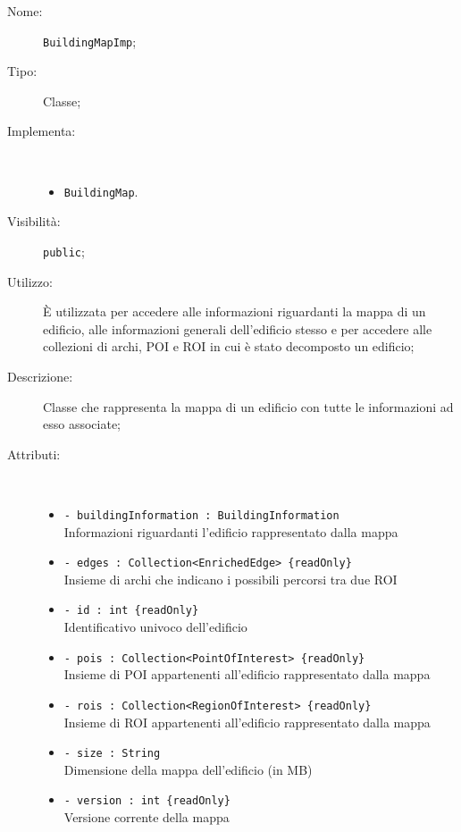 \documentclass[../DefinizioneDiProdotto.tex]{subfiles}
\begin{document}
\begin{description}
	\item[Nome:] \texttt{BuildingMapImp};
	\item[Tipo:] Classe;
	\item[Implementa:] \
	\begin{itemize}
		\item \texttt{BuildingMap}.
		
	\end{itemize}
	\item[Visibilità:] \texttt{public};
	\item[Utilizzo:] È utilizzata per accedere alle informazioni riguardanti la mappa di un edificio, alle informazioni generali dell'edificio stesso e per accedere alle collezioni di archi, POI e ROI in cui è stato decomposto un edificio;
	\item[Descrizione:] Classe che rappresenta la mappa di un edificio con tutte le informazioni ad esso associate;
	\item[Attributi:] \
	\begin{itemize}
		\item \texttt{- buildingInformation : BuildingInformation}\\
		Informazioni riguardanti l'edificio rappresentato dalla mappa
		
		\item \texttt{- edges : Collection<EnrichedEdge> \{readOnly\}}\\
		Insieme di archi che indicano i possibili percorsi tra due ROI
		
		\item \texttt{- id : int \{readOnly\}}\\
		Identificativo univoco dell'edificio
		
		\item \texttt{- pois : Collection<PointOfInterest> \{readOnly\}}\\
		Insieme di POI appartenenti all'edificio rappresentato dalla mappa
		
		\item \texttt{- rois : Collection<RegionOfInterest> \{readOnly\}}\\
		Insieme di ROI appartenenti all'edificio rappresentato dalla mappa
		
		\item \texttt{- size : String}\\
		Dimensione della mappa dell'edificio (in MB)
		
		\item \texttt{- version : int \{readOnly\}}\\
		Versione corrente della mappa
		

\end{itemize}
\end{description}
\end{document}
